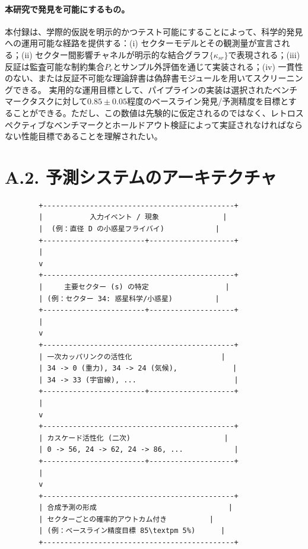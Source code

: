 \documentclass[13pt,a4paper]{ltjsarticle}
\begin{document}
	\paragraph{本研究で発見を可能にするもの。}
	本付録は、学際的仮説を明示的かつテスト可能にすることによって、科学的発見への運用可能な経路を提供する：(i) セクターモデルとその観測量が宣言される；(ii) セクター間影響チャネルが明示的な結合グラフ$\{\kappa_{sr}\}$で表現される；(iii) 反証は監査可能な制約集合$P_r$とサンプル外評価を通じて実装される；(iv) 一貫性のない、または反証不可能な理論辞書は偽辞書モジュールを用いてスクリーニングできる。
	実用的な運用目標として、パイプラインの実装は選択されたベンチマークタスクに対して$0.85\pm0.05$程度のベースライン発見/予測精度を目標とすることができる。ただし、この数値は先験的に仮定されるのではなく、レトロスペクティブなベンチマークとホールドアウト検証によって実証されなければならない性能目標であることを理解されたい。
	
	\section*{A.2. 予測システムのアーキテクチャ}
	
	\begin{lstlisting}
		+---------------------------------------------+
		|           入力イベント / 現象               |
		|  (例：直径 D の小惑星フライバイ)            |
		+------------------------+--------------------+
		|
		v
		+---------------------------------------------+
		|     主要セクター (s) の特定                  |
		| (例：セクター 34: 惑星科学/小惑星)          |
		+------------------------+--------------------+
		|
		v
		+---------------------------------------------+
		| 一次カッパリンクの活性化                     |
		| 34 -> 0 (重力), 34 -> 24 (気候),             |
		| 34 -> 33 (宇宙線), ...                       |
		+------------------------+--------------------+
		|
		v
		+---------------------------------------------+
		| カスケード活性化 (二次)                      |
		| 0 -> 56, 24 -> 62, 24 -> 86, ...            |
		+------------------------+--------------------+
		|
		v
		+---------------------------------------------+
		| 合成予測の形成                               |
		| セクターごとの確率的アウトカム付き          |
		| (例：ベースライン精度目標 85\textpm 5%)      |
		+---------------------------------------------+
	\end{lstlisting}
	
\end{document}
